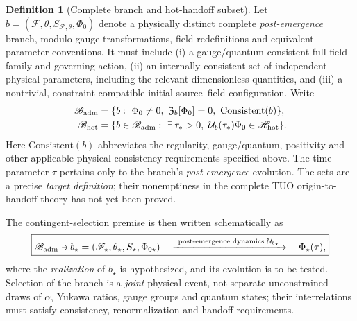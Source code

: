 \documentclass[11pt,a4paper]{article}
\theoremstyle{tmon}
\theoremstyle{definition}
\newtheorem{definition}[theorem]{Definition}
\begin{document}
\begin{definition}[Complete branch and hot-handoff subset]\label{def:c002branch}
Let $b=(\mathscr F,\theta,S_{\mathscr F,\theta},\Phi_0)$ denote a physically distinct complete \emph{post-emergence} branch, modulo gauge transformations, field redefinitions and equivalent parameter conventions. It must include (i) a gauge/quantum-consistent full field family and governing action, (ii) an internally consistent set of independent physical parameters, including the relevant dimensionless quantities, and (iii) a nontrivial, constraint-compatible initial source--field configuration. Write
\begin{align}\label{eq:c002sets}
\mathscr B_{\rm adm}&=\{b:\ \Phi_0\ne0,\ \mathfrak Z_b[\Phi_0]=0,\ \mathrm{Consistent}(b)\},\\
\mathscr B_{\rm hot}&=\{b\in\mathscr B_{\rm adm}:\ \exists\,\tau_*>0,\ \mathcal U_b(\tau_*)\Phi_0\in\mathscr H_{\rm hot}\}.
\end{align}
Here $\mathrm{Consistent}(b)$ abbreviates the regularity, gauge/quantum, positivity and other applicable physical consistency requirements specified above.
The time parameter $\tau$ pertains only to the branch's \emph{post-emergence} evolution. The sets are a precise \emph{target definition}; their nonemptiness in the complete TUO origin-to-handoff theory has not yet been proved.
\end{definition}

The contingent-selection premise is then written schematically as
\begin{equation}\label{eq:c002selection}
\boxed{\mathscr B_{\rm adm}\ni b_\star=(\mathscr F_\star,\theta_\star,S_\star,\Phi_{0\star})
\quad\xrightarrow{\ \text{post-emergence dynamics }\mathcal U_{b_\star}\ }\quad
\Phi_\star(\tau),}
\end{equation}
where the \emph{realization} of $b_\star$ is hypothesized, and its evolution is to be tested. Selection of the branch is a \emph{joint} physical event, not separate unconstrained draws of $\alpha$, Yukawa ratios, gauge groups and quantum states; their interrelations must satisfy consistency, renormalization and handoff requirements.
\end{document}
